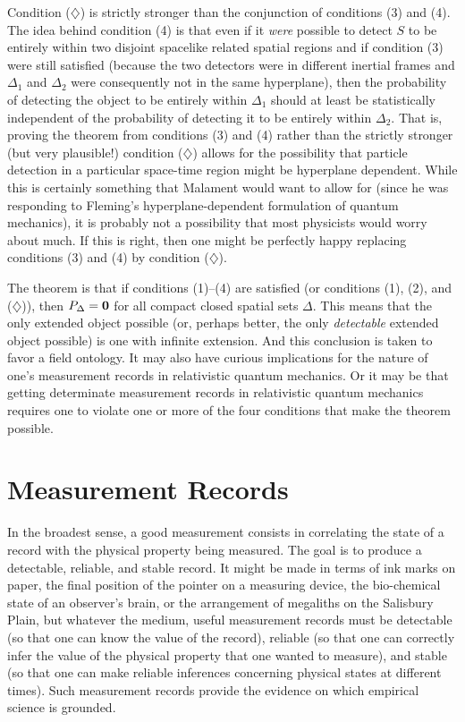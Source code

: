 \documentclass [12pt]{article}
\begin{document}
Condition ($\diamondsuit$) is strictly stronger than the conjunction of
conditions (3) and (4).  The idea behind condition (4) is that even if it {\em were\/}
possible to detect $S$ to be entirely within two disjoint spacelike related spatial regions and
if condition (3) were still satisfied (because the two detectors were in different inertial
frames and $\Delta_1$ and $\Delta_2$ were consequently not in the same hyperplane),
then the probability of detecting the object to be entirely within $\Delta_1$ should at
least be statistically independent of the probability of detecting it to be entirely within
$\Delta_2$.  That is, proving the theorem from conditions (3) and (4) rather than the strictly
stronger (but very plausible!) condition ($\diamondsuit$) allows for the possibility that
particle detection in a particular space-time region might be hyperplane dependent.  While
this is certainly something that Malament would want to allow for (since he was responding to
Fleming's hyperplane-dependent formulation of quantum mechanics), it is probably not a
possibility that most physicists would worry about much.  If this is right, then one might
be perfectly happy replacing conditions (3) and (4) by condition ($\diamondsuit$).


The theorem is that if conditions (1)--(4) are satisfied (or conditions (1), (2), and
($\diamondsuit$)), then $P_\Delta=\mbox{\bf 0}$ for all compact closed spatial sets
$\Delta$.  This means that the only extended object possible (or, perhaps better,
the only {\em detectable\/} extended object possible) is one with infinite
extension.  And this conclusion is taken to favor a field ontology.  It may also
have curious implications for the nature of one's measurement records in relativistic
quantum mechanics.  Or it may be that getting determinate measurement
records in relativistic quantum mechanics requires one to violate one or
more of the four conditions that make the theorem possible.



\section{Measurement Records}


In the broadest sense, a good measurement consists in correlating the state
of a record with the physical property being measured.  The goal is to produce a
detectable, reliable, and stable record.  It might be made in terms of ink marks on paper,
the final position of the pointer on a measuring device, the bio-chemical state
of an observer's brain, or the arrangement of megaliths on the Salisbury Plain,
but whatever the medium, useful measurement records must be detectable (so that
one can know the value of the record), reliable (so that one can correctly infer
the value of the physical property that one wanted to measure), and stable (so
that one can make reliable inferences concerning physical states at different
times).  Such measurement records provide the evidence on which empirical science
is grounded.
\end{document}
